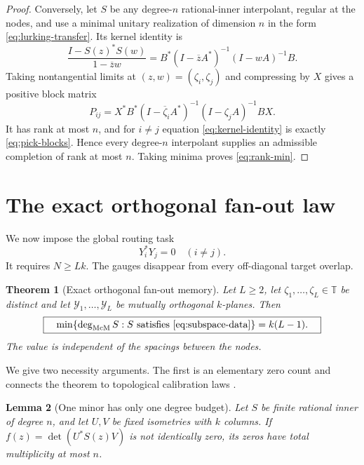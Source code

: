 \documentclass[11pt]{article}
\newtheorem{theorem}{Theorem}[section]
\newtheorem{lemma}[theorem]{Lemma}
\theoremstyle{definition}
\theoremstyle{remark}
\newcommand{\T}{\mathbb T}
\newcommand{\mcdeg}{\deg_{\mathrm{McM}}}
\begin{document}
\begin{proof}
Conversely, let $S$ be any degree-$n$ rational-inner interpolant, regular at
the nodes, and use a minimal unitary realization of dimension $n$ in the
form \eqref{eq:lurking-transfer}.  Its kernel identity is
\begin{equation}\label{eq:kernel-identity}
 \frac{I-S(z)^*S(w)}{1-\overline zw}
 =B^*(I-\overline zA^*)^{-1}(I-wA)^{-1}B.
\end{equation}
Taking nontangential limits at $(z,w)=(\zeta_i,\zeta_j)$ and compressing by
$X$ gives a positive block matrix
\[
 P_{ij}=X^*B^*(I-\overline\zeta_iA^*)^{-1}
              (I-\zeta_jA)^{-1}BX.
\]
It has rank at most $n$, and for $i\ne j$ equation
\eqref{eq:kernel-identity} is exactly \eqref{eq:pick-blocks}.  Hence every
degree-$n$ interpolant supplies an admissible completion of rank at most
$n$.  Taking minima proves \eqref{eq:rank-min}.
\end{proof}

\section{The exact orthogonal fan-out law}

We now impose the global routing task
\begin{equation}\label{eq:orthogonal-data}
                 Y_i^*Y_j=0\quad(i\ne j).
\end{equation}
It requires $N\ge Lk$.  The gauges disappear from every off-diagonal target
overlap.

\begin{theorem}[Exact orthogonal fan-out memory]
\label{thm:fanout}
Let $L\ge2$, let $\zeta_1,\ldots,\zeta_L\in\T$ be distinct and let
$\mathcal Y_1,\ldots,\mathcal Y_L$ be mutually orthogonal $k$-planes.
Then
\begin{equation}\label{eq:fanout-law}
 \boxed{\quad
 \min\{\mcdeg S:S\text{ satisfies \eqref{eq:subspace-data}}\}
 =k(L-1).
 \quad}
\end{equation}
The value is independent of the spacings between the nodes.
\end{theorem}

We give two necessity arguments.  The first is an elementary zero count and
connects the theorem to topological calibration laws
\cite{ErikssonCalibration2026}.

\begin{lemma}[One minor has only one degree budget]
\label{lem:minor-budget}
Let $S$ be finite rational inner of degree $n$, and let $U,V$ be fixed
isometries with $k$ columns.  If
$f(z)=\det(U^*S(z)V)$ is not identically zero, its zeros have total
multiplicity at most $n$.
\end{lemma}
\end{document}

